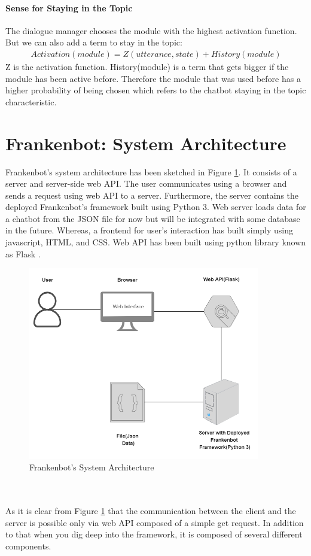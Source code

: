 \paragraph*{Sense for Staying in the Topic}
The dialogue manager chooses the module with the highest activation function. But we can also add a term to stay in the topic: 
\begin{align*}
 Activation(module) = Z(utterance, state) + History(module)
\end{align*} 
Z is the activation function. History(module) is a term that gets bigger if the module has been active before. Therefore the module that was used before has a higher probability of being chosen which refers to the chatbot staying in the topic characteristic.

\section{Frankenbot: System Architecture}
Frankenbot’s system architecture has been sketched in Figure \ref{fig:sysArch}. It consists of a server and server-side web API. The user communicates using a browser and sends a request using web API to a server. Furthermore, the server contains the deployed Frankenbot's framework built using Python 3. Web server loads data for a chatbot from the JSON file for now but will be integrated with some database in the future. Whereas, a frontend for user's interaction has built simply using javascript, HTML, and CSS. Web API has been built using python library known as Flask \cite{flask}. 

\begin{figure}[!h]
    \centering
    \includegraphics[width=0.9\textwidth]{img/System_Architecture_Updated.PNG}
    \caption{Frankenbot's System Architecture}
    \label{fig:sysArch}
\end{figure} 
\\~\\
As it is clear from Figure \ref{fig:sysArch} that the communication between the client and the server is possible only via web API composed of a simple get request. In addition to that when you dig deep into the framework, it is composed of several different components.

